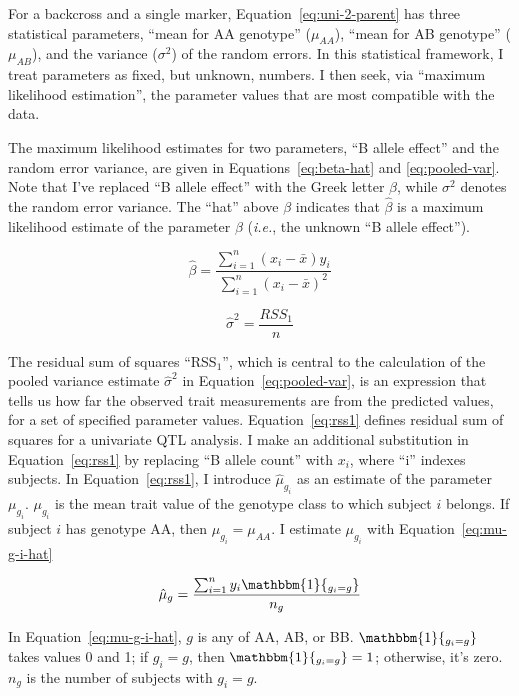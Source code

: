 \documentclass[oneside]{book}\usepackage[]{graphicx}\usepackage[]{color}
\begin{document}
For a backcross and a single marker, Equation~\ref{eq:uni-2-parent} has three statistical 
parameters, ``mean for AA genotype'' ($\mu_{AA}$), ``mean for AB genotype'' ($\mu_{AB}$), and the variance ($\sigma^2$) of the random errors. In this 
statistical framework, I treat parameters as fixed, but unknown, numbers. I then 
seek, via ``maximum likelihood estimation'', the parameter values that are most compatible with the data.

The maximum likelihood estimates for two parameters, ``B allele effect'' and 
the random error variance, are given in Equations~\ref{eq:beta-hat} and
\ref{eq:pooled-var}. Note that I've replaced ``B allele effect'' with 
the Greek letter 
$\beta$, while $\sigma^2$ denotes the random error variance. The ``hat'' 
above $\beta$ indicates that $\hat\beta$ is a maximum likelihood estimate of the 
parameter $\beta$ (\emph{i.e.}, the unknown ``B allele effect'').

\begin{equation}
\hat\beta = \frac{\sum_{i=1}^n(x_i - \bar x)y_i}{\sum_{i = 1}^n(x_i - \bar x)^2}
\label{eq:beta-hat}
\end{equation}



\begin{equation}
\widehat\sigma^2 = \frac{RSS_1}{n}
\label{eq:pooled-var}
\end{equation}

The residual sum of squares ``RSS$_1$'', which is central to the
calculation of the pooled variance estimate $\widehat\sigma^2$ in Equation~\ref{eq:pooled-var}, is an expression that
tells us how far the observed trait measurements are
from the predicted values, for a
set of specified parameter values. Equation~\ref{eq:rss1} defines residual
sum of squares for a univariate QTL analysis. I make an additional substitution in 
Equation~\ref{eq:rss1} by replacing ``B allele count'' with $x_i$, where ``i'' indexes subjects. In 
Equation~\ref{eq:rss1}, I introduce $\hat\mu_{g_i}$ as an estimate of the parameter 
$\mu_{g_i}$. $\mu_{g_i}$ is the mean trait value of the genotype class to which subject 
$i$ belongs. If subject $i$ has genotype AA, then $\mu_{g_i} = \mu_{AA}$. I estimate 
$\mu_{g_i}$ with Equation~\ref{eq:mu-g-i-hat}

\begin{equation}
\hat\mu_{g} = \frac{\sum_{i = 1}^ny_i\mathbbm{1}{_{g_i = g}}}{n_{g}}
\label{eq:mu-g-i-hat}
\end{equation}

In Equation~\ref{eq:mu-g-i-hat}, $g$ is any of AA, AB, or BB. $\mathbbm{1}{_{g_i = g}}$ 
takes values 0 and 1; if $g_i = g$, then $\mathbbm{1}{_{g_i = g}} = 1$; otherwise, it's zero.
$n_g$ is the number of subjects with $g_i = g$. 
\end{document}
